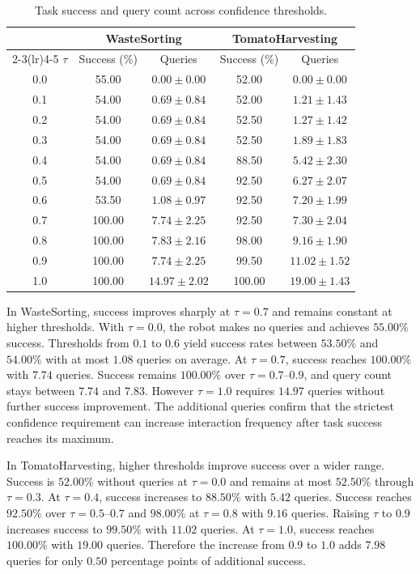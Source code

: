 \begin{table}[t]
\centering
\caption{Task success and query count across confidence thresholds.}
\label{tab:threshold_results}
\small
\begin{tabular}{ccccc}
\toprule
 & \multicolumn{2}{c}{WasteSorting} & \multicolumn{2}{c}{TomatoHarvesting} \\
\cmidrule(lr){2-3}\cmidrule(lr){4-5}
$\tau$ & Success (\%) & Queries & Success (\%) & Queries \\
\midrule
0.0 & 55.00 & $0.00 \pm 0.00$ & 52.00 & $0.00 \pm 0.00$ \\
0.1 & 54.00 & $0.69 \pm 0.84$ & 52.00 & $1.21 \pm 1.43$ \\
0.2 & 54.00 & $0.69 \pm 0.84$ & 52.50 & $1.27 \pm 1.42$ \\
0.3 & 54.00 & $0.69 \pm 0.84$ & 52.50 & $1.89 \pm 1.83$ \\
0.4 & 54.00 & $0.69 \pm 0.84$ & 88.50 & $5.42 \pm 2.30$ \\
0.5 & 54.00 & $0.69 \pm 0.84$ & 92.50 & $6.27 \pm 2.07$ \\
0.6 & 53.50 & $1.08 \pm 0.97$ & 92.50 & $7.20 \pm 1.99$ \\
0.7 & 100.00 & $7.74 \pm 2.25$ & 92.50 & $7.30 \pm 2.04$ \\
0.8 & 100.00 & $7.83 \pm 2.16$ & 98.00 & $9.16 \pm 1.90$ \\
0.9 & 100.00 & $7.74 \pm 2.25$ & 99.50 & $11.02 \pm 1.52$ \\
1.0 & 100.00 & $14.97 \pm 2.02$ & 100.00 & $19.00 \pm 1.43$ \\
\bottomrule
\end{tabular}
\end{table}

In WasteSorting, success improves sharply at $\tau=0.7$ and remains constant at higher thresholds. With $\tau=0.0$, the robot makes no queries and achieves $55.00\%$ success. Thresholds from $0.1$ to $0.6$ yield success rates between $53.50\%$ and $54.00\%$ with at most $1.08$ queries on average. At $\tau=0.7$, success reaches $100.00\%$ with $7.74$ queries. Success remains $100.00\%$ over $\tau=0.7$--$0.9$, and query count stays between $7.74$ and $7.83$. However $\tau=1.0$ requires $14.97$ queries without further success improvement. The additional queries confirm that the strictest confidence requirement can increase interaction frequency after task success reaches its maximum.

In TomatoHarvesting, higher thresholds improve success over a wider range. Success is $52.00\%$ without queries at $\tau=0.0$ and remains at most $52.50\%$ through $\tau=0.3$. At $\tau=0.4$, success increases to $88.50\%$ with $5.42$ queries. Success reaches $92.50\%$ over $\tau=0.5$--$0.7$ and $98.00\%$ at $\tau=0.8$ with $9.16$ queries. Raising $\tau$ to $0.9$ increases success to $99.50\%$ with $11.02$ queries. At $\tau=1.0$, success reaches $100.00\%$ with $19.00$ queries. Therefore the increase from $0.9$ to $1.0$ adds $7.98$ queries for only $0.50$ percentage points of additional success.

